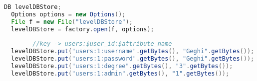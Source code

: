 \begin{lstlisting}[language=Java,  basicstyle=\footnotesize]
  DB levelDBStore;
  Options options = new Options();
  File f = new File("levelDBStore");
  levelDBStore = factory.open(f, options);
    	
    	//key -> users:$user_id:$attribute_name
  levelDBStore.put("users:1:username".getBytes(), "Geghi".getBytes());
  levelDBStore.put("users:1:password".getBytes(), "Geghi".getBytes());
  levelDBStore.put("users:1:degree".getBytes(), "3".getBytes());
  levelDBStore.put("users:1:admin".getBytes(), "1".getBytes());

\end{lstlisting}
